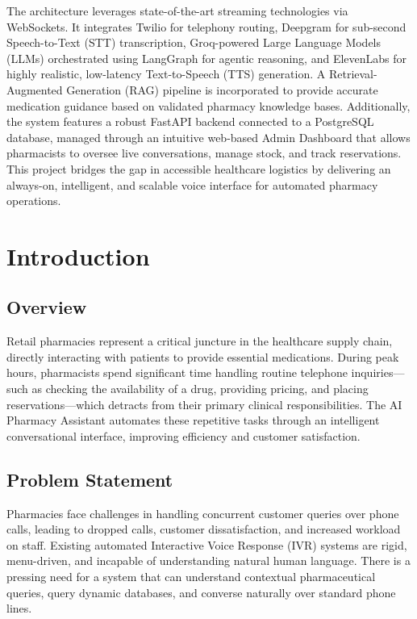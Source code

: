 \documentclass[12pt,a4paper]{report}
\begin{document}
The architecture leverages state-of-the-art streaming technologies via WebSockets. It integrates Twilio for telephony routing, Deepgram for sub-second Speech-to-Text (STT) transcription, Groq-powered Large Language Models (LLMs) orchestrated using LangGraph for agentic reasoning, and ElevenLabs for highly realistic, low-latency Text-to-Speech (TTS) generation. A Retrieval-Augmented Generation (RAG) pipeline is incorporated to provide accurate medication guidance based on validated pharmacy knowledge bases. Additionally, the system features a robust FastAPI backend connected to a PostgreSQL database, managed through an intuitive web-based Admin Dashboard that allows pharmacists to oversee live conversations, manage stock, and track reservations. This project bridges the gap in accessible healthcare logistics by delivering an always-on, intelligent, and scalable voice interface for automated pharmacy operations.

\newpage

\tableofcontents
\newpage
\listoffigures
{}
\newpage


\chapter{Introduction}

\section{Overview}
Retail pharmacies represent a critical juncture in the healthcare supply chain, directly interacting with patients to provide essential medications. During peak hours, pharmacists spend significant time handling routine telephone inquiries—such as checking the availability of a drug, providing pricing, and placing reservations—which detracts from their primary clinical responsibilities. The AI Pharmacy Assistant automates these repetitive tasks through an intelligent conversational interface, improving efficiency and customer satisfaction.

\section{Problem Statement}
Pharmacies face challenges in handling concurrent customer queries over phone calls, leading to dropped calls, customer dissatisfaction, and increased workload on staff. Existing automated Interactive Voice Response (IVR) systems are rigid, menu-driven, and incapable of understanding natural human language. There is a pressing need for a system that can understand contextual pharmaceutical queries, query dynamic databases, and converse naturally over standard phone lines.
\end{document}
